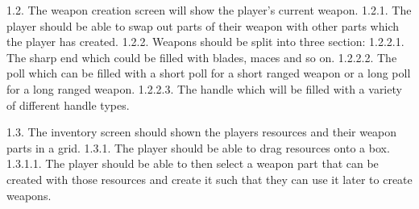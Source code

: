 \documentclass[11pt,openright,a4paper]{report}
\newcommand{\forceindent}{\leavevmode{\parindent=1em\indent}}
\begin{document}
		\forceindent 1.2. The weapon creation screen will show the player's current weapon.\newline
		\forceindent \forceindent 1.2.1. The player should be able to swap out parts of their weapon with other parts which the player has created.\newline
		\forceindent \forceindent 1.2.2. Weapons should be split into three section:\newline
		\forceindent \forceindent \forceindent 1.2.2.1. The sharp end which could be filled with blades, maces and so on.\newline
		\forceindent \forceindent \forceindent 1.2.2.2. The poll which can be filled with a short poll for a short ranged weapon or a long poll for a long ranged weapon.\newline
		\forceindent \forceindent \forceindent 1.2.2.3. The handle which will be filled with a variety of different handle types. \newline
		
		\forceindent 1.3. The inventory screen should shown the players resources and their weapon parts in a grid.\newline
		\forceindent \forceindent 1.3.1. The player should be able to drag resources onto a box. \newline
		\forceindent \forceindent 1.3.1.1. The player should be able to then select a weapon part that can be created with those resources and create it such that they can use it later to create weapons. \newline
		
\end{document}
